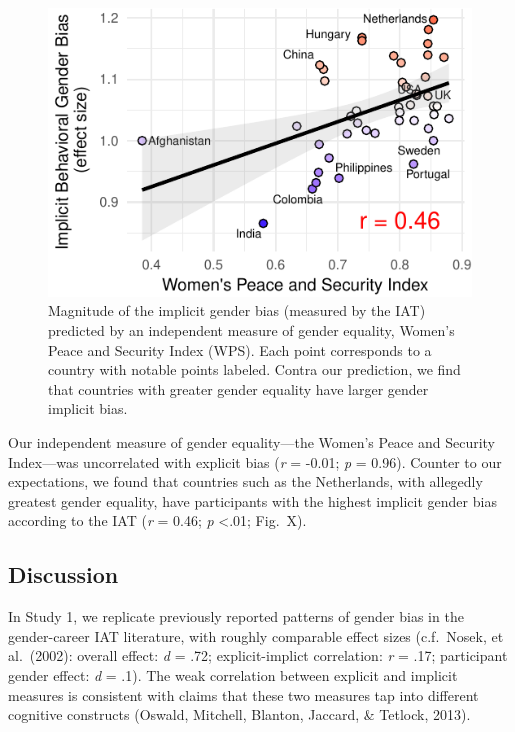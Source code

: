 \documentclass[10pt, letterpaper]{article}
\newenvironment{CodeChunk}{}{}
\begin{document}
\begin{CodeChunk}
\begin{figure}[t]

{\centering \includegraphics{figs/WPS_plot-1} 

}

\caption[Magnitude of the implicit gender bias (measured by the IAT) predicted by an independent measure of gender equality, Women's Peace and Security Index (WPS)]{Magnitude of the implicit gender bias (measured by the IAT) predicted by an independent measure of gender equality, Women's Peace and Security Index (WPS).  Each point corresponds to a country with notable points labeled. Contra our prediction, we find that countries with greater gender equality have larger gender implicit bias.}\label{fig:WPS_plot}
\end{figure}
\end{CodeChunk}

Our independent measure of gender equality---the Women's Peace and
Security Index---was uncorrelated with explicit bias (\emph{r} = -0.01;
\emph{p} = 0.96). Counter to our expectations, we found that countries
such as the Netherlands, with allegedly greatest gender equality, have
participants with the highest implicit gender bias according to the IAT
(\emph{r} = 0.46; \emph{p} \textless{}.01; Fig.~X).

\subsection{Discussion}\label{discussion}

In Study 1, we replicate previously reported patterns of gender bias in
the gender-career IAT literature, with roughly comparable effect sizes
(c.f.~Nosek, et al.~(2002): overall effect: \emph{d} = .72;
explicit-implict correlation: \emph{r} = .17; participant gender effect:
\emph{d} = .1). The weak correlation between explicit and implicit
measures is consistent with claims that these two measures tap into
different cognitive constructs (Oswald, Mitchell, Blanton, Jaccard, \&
Tetlock, 2013).
\end{document}
